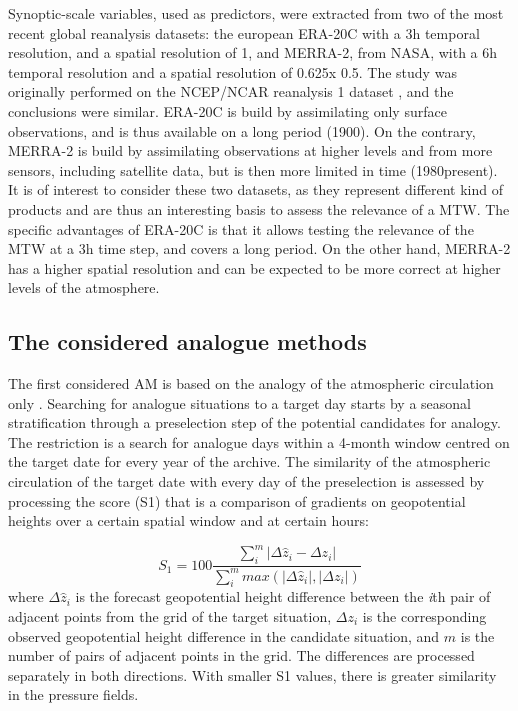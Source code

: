 \documentclass[hess, manuscript]{copernicus}
\begin{document}
	Synoptic-scale variables, used as predictors, were extracted from two of the most recent global reanalysis datasets: the european ERA-20C \citep{Poli2016} with a 3h temporal resolution, and a spatial resolution of 1\textdegree, and MERRA-2, from NASA, with a 6h temporal resolution and a spatial resolution of 0.625\textdegree x 0.5\textdegree. The study was originally performed on the NCEP/NCAR reanalysis 1 dataset \citep{Kalnay1996}, and the conclusions were similar. ERA-20C is build by assimilating only surface observations, and is thus available on a long period (1900). On the contrary, MERRA-2 is build by assimilating observations at higher levels and from more sensors, including satellite data, but is then more limited in time (1980\textendash present). It is of interest to consider these two datasets, as they represent different kind of products and are thus an interesting basis to assess the relevance of a MTW. The specific advantages of ERA-20C is that it allows testing the relevance of the MTW at a 3h time step, and covers a long period. On the other hand, MERRA-2 has a higher spatial resolution and can be expected to be more correct at higher levels of the atmosphere.
	
	\subsection{The considered analogue methods}
	\label{sec:analog_method}
	
	The first considered AM is based on the analogy of the atmospheric circulation only \citep[Table \ref{table:method_2Z},][]{Obled2002, Bontron2005}. Searching for analogue situations to a target day starts by a seasonal stratification through a preselection step of the potential candidates for analogy. The restriction is a search for analogue days within a 4-month window centred on the target date for every year of the archive. The similarity of the atmospheric circulation of the target date with every day of the preselection is assessed by processing the \citet{Teweles1954} score (S1) that is a comparison of gradients on geopotential heights over a certain spatial window and at certain hours:
	
	\begin{equation}
	\label{eq:S1}
	S_{1}=100 \frac {\displaystyle \sum_{i}^{m} \vert \Delta\hat{z}_{i} - \Delta z_{i} \vert}
	{\displaystyle \sum_{i}^{m} max( \vert \Delta\hat{z}_{i} \vert , \vert \Delta z_{i} \vert ) }
	\end{equation}
	where $\Delta \hat{z}_{i}$ is the forecast geopotential height difference between the \textit{i}th pair of adjacent points from the grid of the target situation, $\Delta z_{i}$ is the corresponding observed geopotential height difference in the candidate situation, and $m$ is the number of pairs of adjacent points in the grid. The differences are processed separately in both directions. With smaller S1 values, there is greater similarity in the pressure fields.
	
\end{document}
